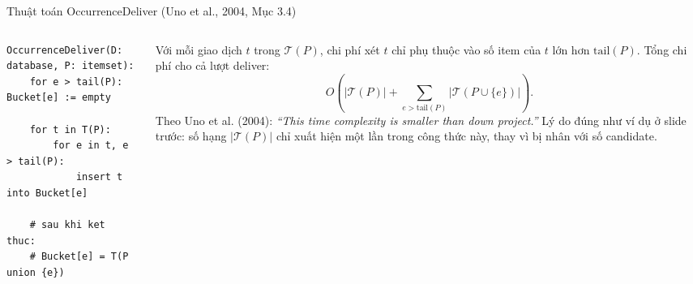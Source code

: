 \documentclass[9pt, aspectratio=169]{beamer}
\begin{document}
\begin{frame}[fragile]{Thuật toán OccurrenceDeliver (Uno et al., 2004, Mục 3.4)}
  \begin{columns}[T,onlytextwidth]
    \begin{column}{0.46\textwidth}
\begin{lstlisting}
OccurrenceDeliver(D: database, P: itemset):
    for e > tail(P): Bucket[e] := empty

    for t in T(P):
        for e in t, e > tail(P):
            insert t into Bucket[e]

    # sau khi ket thuc:
    # Bucket[e] = T(P union {e})
\end{lstlisting}
    \end{column}
    \begin{column}{0.5\textwidth}
      \small
      Với mỗi giao dịch $t$ trong $\mathcal T(P)$, chi phí xét $t$ chỉ phụ
      thuộc vào số item của $t$ lớn hơn $\mathrm{tail}(P)$. Tổng chi phí cho
      cả lượt deliver:
      \[
        O\!\left(|\mathcal T(P)|+\sum_{e>\mathrm{tail}(P)}|\mathcal T(P\cup\{e\})|\right).
      \]
      Theo Uno et al. (2004): \textit{``This time complexity is smaller
      than down project.''} Lý do đúng như ví dụ ở slide trước: số hạng
      $|\mathcal T(P)|$ chỉ xuất hiện một lần trong công thức này, thay vì
      bị nhân với số candidate.
    \end{column}
  \end{columns}
\end{frame}
\end{document}
